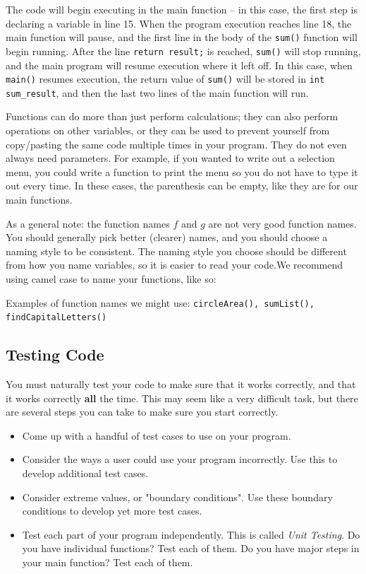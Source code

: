 The code will begin executing in the main function -- in this case, the first step is declaring a variable in line 15. When the program execution reaches line 18, the main function will pause, and the first line in the body of the \texttt{sum()} function will begin running. After the line \texttt{return result;} is reached, \texttt{sum()} will stop running, and the main program will resume execution where it left off. In this case, when \texttt{main()} resumes execution, the return value of \texttt{sum()} will be stored in \texttt{int sum_result}, and then the last two lines of the main function will run.

Functions can do more than just perform calculations; they can also perform operations on other variables, or they can be used to prevent yourself from copy/pasting the same code multiple times in your program. They do not even always need parameters. For example, if you wanted to write out a selection menu, you could write a function to print the menu so you do not have to type it out every time. In these cases, the parenthesis can be empty, like they are for our main functions. 

As a general note: the function names $f$ and $g$ are not very good function names. You should generally pick better (clearer) names, and you should choose a naming style to be consistent. The naming style you choose should be different from how you name variables, so it is easier to read your code.We recommend using camel case to name your functions, like so:

Examples of function names we might use: \texttt{circleArea(), sumList(), findCapitalLetters()}


\subsection{Testing Code}
You must naturally test your code to make sure that it works correctly, and that it works correctly \textbf{all} the time. This may seem like a very difficult task, but there are several steps you can take to make sure you start correctly.

\begin{itemize}
    \item Come up with a handful of test cases to use on your program. 
    \item Consider the ways a user could use your program incorrectly. Use this to develop additional test cases.
    \item Consider extreme values, or "boundary conditions". Use these boundary conditions to develop yet more test cases.
    \item Test each part of your program independently. This is called \textit{Unit Testing}. Do you have individual functions? Test each of them. Do you have major steps in your main function? Test each of them.
\end{itemize}

